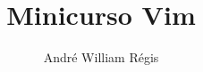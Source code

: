 \documentclass{beamer}
\title{Minicurso Vim}
\author{André William Régis}
\institute{UFSC}
\date{\the\year}
\begin{document}
\frame{\titlepage}







\end{document}
